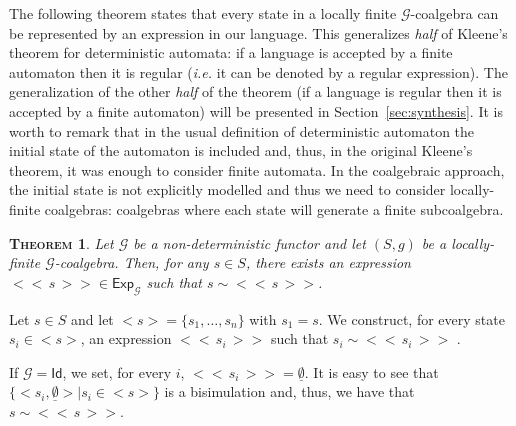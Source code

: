 \documentclass{LMCS}
\newcommand\Exp{\mathsf{Exp}}
\newcommand\id{\mathsf{Id}}
\newcommand\G{\mathcal{G}}
\newcommand\emp{\underline\emptyset}
\def\expr#1{<\!< \, #1 \, >\!>}
\def\hyph{-\penalty0\hskip0pt\relax}
\theoremstyle{definition}
\theoremstyle{plain}
\theoremstyle{plain}
\newtheorem{mytheorem}[mydefinition]{\textsc{Theorem}}
\theoremstyle{plain}
\theoremstyle{plain}
\theoremstyle{definition}
\theoremstyle{definition}
\newenvironment{theorem}{
\begin{mytheorem}}
    {\end{mytheorem}}
\begin{document}
The following theorem states that every state in a locally finite
$\G$-coalgebra can be represented by an expression in our language.
This generalizes {\em half} of Kleene's theorem for deterministic automata: if a language is
accepted by a finite automaton then it is regular ({\em i.e.} it can
be denoted by a regular expression). The
generalization of the other {\em half} of the theorem (if a language
is regular then it is accepted by a finite automaton) will be
presented in Section~\ref{sec:synthesis}. It is worth to remark that
in the usual definition of deterministic automaton the initial state
of the automaton is included and, thus, in the original Kleene's
theorem, it was enough to consider finite automata. In the
coalgebraic approach, the initial state is not explicitly modelled and
thus we need to consider locally-finite coalgebras: coalgebras where each state will generate a finite subcoalgebra.
\begin{theorem}\label{kleene1}
Let $\G$ be a non\hyph deterministic functor and let $(S,g)$ be a
locally-finite $\G$-coalgebra. Then, for any $s \in S$, there exists an
expression $\expr s \in \Exp_\G$ such that $s\sim \expr s$. 
\end{theorem}

\proof 
Let $s\in S$ and let $<s>= \{s_1, \ldots, s_n\}$ with $s_1=s$.
We construct, for every state $s_i \in <s>$, an expression $\expr {s_i} $ such that $s_i \sim \expr {s_i} $ .

If $\G= \id$, we set, for every $i$, $\expr {s_i} = \emp$.  It is easy to see that $\{<s_i,\emp> \mid s_i\in <s> \}$ is a bisimulation and, thus, we have that $s \sim \expr s$.
\end{document}
